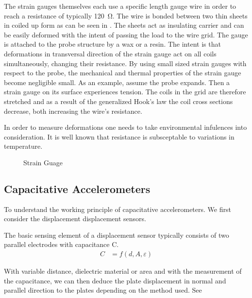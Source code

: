 The strain gauges themselves each use a specific length gauge wire in order to reach a resistance of typically \SI{120}{\ohm}. The wire is bonded between two thin sheets in coiled up form as can be seen in . The sheets act as insulating carrier and can be easily deformed with the intent of passing the load to the wire grid. The gauge is attached to the probe structure by a wax or a resin. The intent is that deformations in transversal direction of the strain gauge act on all coils simultaneously, changing their resistance. By using small sized strain gauges with respect to the probe, the mechanical and thermal properties of the strain gauge become negligible small. As an example, assume the probe expands. Then a strain gauge on its surface experiences tension. The coils in the grid are therefore stretched and as a result of the generalized Hook's law the coil cross sections decrease, both increasing the wire's resistance. 

In order to measure deformations one needs to take environmental infulences into consideration. It is well known that resistance is subsceptable to variations in temperature.
\begin{figure}[!htb]
    \centering
    \hspace{4em}
    \caption[Strain Gauge]{Strain Guage}
\end{figure}

\subsection{Capacitative Accelerometers}

To understand the working principle of capacitative accelerometers. We first consider the displacement displacement sensors.

The basic sensing element of a displacement sensor typically consists of two parallel electrodes with capacitance C.
\begin{align}
    C &= f(d,A,\varepsilon)
\end{align}

With variable distance, dielectric material or area and with the measurement of the capacitance, we can then deduce the plate displacement in normal and parallel direction to the plates depending on the method used. See  

